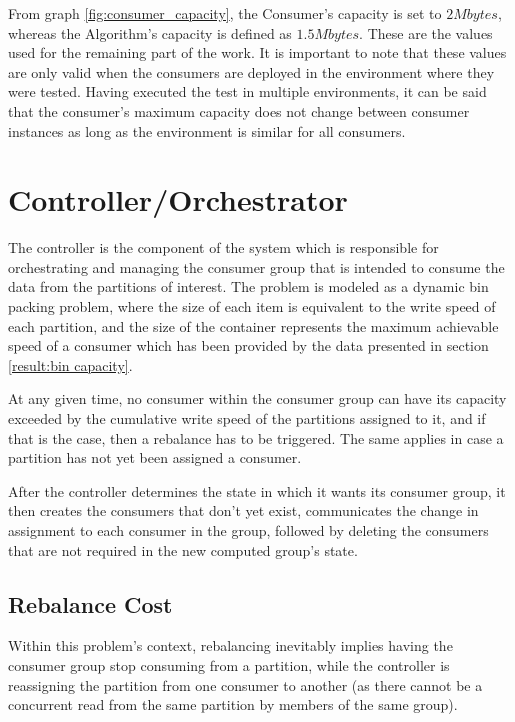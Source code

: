 From graph \ref{fig:consumer_capacity}, the Consumer's capacity is set to $2
Mbytes$, whereas the Algorithm's capacity is defined as $1.5 Mbytes$.  These are
the values used for the remaining part of the work.  It is important to note
that these values are only valid when the consumers are deployed in the
environment where they were tested. Having executed the test in multiple
environments, it can be said that the consumer's maximum capacity does not
change between consumer instances as long as the environment is similar for all
consumers.

\section{Controller/Orchestrator} \label{component:controller}

The controller is the component of the system which is responsible for
orchestrating and managing the consumer group that is intended to consume the
data from the partitions of interest.  The problem is modeled as a dynamic bin
packing problem, where the size of each item is equivalent to the write speed of
each partition, and the size of the container represents the maximum achievable
speed of a consumer which has been provided by the data presented in section
\ref{result:bin capacity}.

At any given time, no consumer within the consumer group can have its capacity
exceeded by the cumulative write speed of the partitions assigned to it, and if
that is the case, then a rebalance has to be triggered. The same applies in case
a partition has not yet been assigned a consumer.

After the controller determines the state in which it wants its consumer group,
it then creates the consumers that don't yet exist, communicates the change in
assignment to each consumer in the group, followed by deleting the consumers
that are not required in the new computed group's state.

\subsection{Rebalance Cost}
\label{sub:rscore}

Within this problem's context, rebalancing inevitably implies having the
consumer group stop consuming from a partition, while the controller is
reassigning the partition from one consumer to another (as there cannot be a
concurrent read from the same partition by members of the same group).

